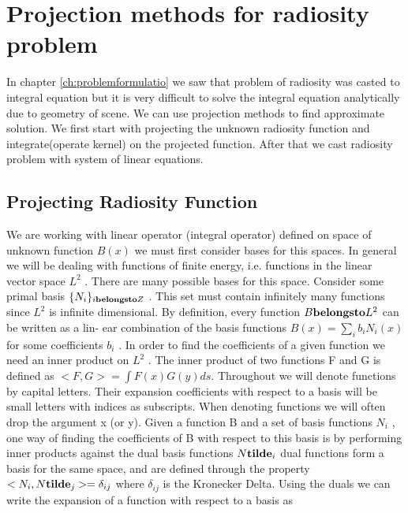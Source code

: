 

\chapter{\label{ch:projection}Projection methods for radiosity problem}
In chapter \ref{ch:problemformulatio} we saw that problem of radiosity was casted to integral equation but it is very difficult to solve the integral equation analytically due to geometry of scene. We can use projection methods to find approximate solution. We first start with projecting the unknown radiosity function and integrate(operate kernel) on the projected function. After that we cast radiosity problem with system of linear equations. \\

\section{Projecting Radiosity Function}
We are working with linear operator (integral operator) defined on space of unknown function $B(x)$ we must first consider bases for this spaces. In general we will be dealing with functions of finite energy, i.e. functions
in the linear vector space $L^2$ . There are many possible bases for
this space. Consider some primal basis $\{N_i \}_{i{\bf belongs to}Z}$ . This set must contain infinitely many functions since $L^2$ is infinite dimensional.
By definition, every function $B{\bf belongs to}L^2$ can be written as a lin-
ear combination of the basis functions $B(x) = \sum _i b_i N_i(x)$ for
some coefficients $b_i$ . In order to find the coefficients of a given
function we need an inner product on $L^2$ . The inner product of
two functions F and G is defined as $<F, G> = \int F(x) G(y) ds$.
Throughout we will denote functions by capital letters. Their expansion coefficients with respect to a basis will be small letters
with indices as subscripts. When denoting functions we will often
drop the argument x (or y).
Given a function B and a set of basis functions $N_i$ , one way
of finding the coefficients of B with respect to this basis is by
performing inner products against the dual basis functions $N{\bf tilde}_i$
dual functions form a basis for the same space, and are defined
through the property\\
$<N_i,N{\bf tilde}_j>=\delta_{ij}$
where $\delta_{ij}$ is the Kronecker Delta. Using the duals we can write
the expansion of a function with respect to a basis as\\

